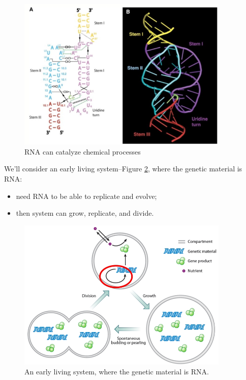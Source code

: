 \documentclass[]{article}
\begin{document}
\begin{figure}[H]
	\caption{RNA can catalyze chemical processes}\label{fig:RNA_can_catalyze_chemical_processes}
	\includegraphics[width=0.9\textwidth]{RNA_can_catalyze_chemical_processes}
\end{figure}

We'll consider an early living system--Figure \ref{fig:RNA_WorldTheory1}\cite{blain2014progress}, where the genetic material is RNA:
\begin{itemize}
	\item need RNA to be able to replicate and evolve;
	\item then system can grow, replicate, and divide.
\end{itemize}
 

\begin{figure}[H]
	\caption{An early living system, where the genetic material is RNA.}\label{fig:RNA_WorldTheory1}
	\includegraphics[width=0.9\textwidth]{RNA_WorldTheory1}
\end{figure}
\end{document}
